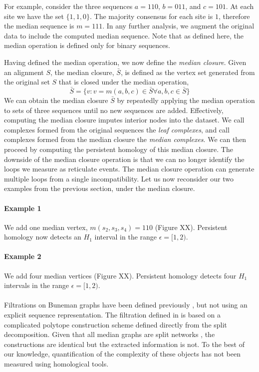 For example, consider the three sequences $a=110$, $b=011$, and $c=101$.
At each site we have the set $\{1,1,0\}$.
The majority consensus for each site is $1$, therefore the median sequence is $m=111$.
In any further analysis, we augment the original data to include the computed median sequence.
Note that as defined here, the median operation is defined only for binary sequences.

Having defined the median operation, we now define the \emph{median closure}.
Given an alignment $S$, the median closure, $\bar{S}$, is defined as the vertex set generated from the original set $S$ that is closed under the median operation,
\begin{equation}
\bar{S} = \{v \colon v=m(a,b,c) \in \bar{S} \forall a,b,c \in \bar{S}\}
\end{equation}
We can obtain the median closure $\bar{S}$ by repeatedly applying the median operation to sets of three sequences until no new sequences are added.
Effectively, computing the median closure imputes interior nodes into the dataset.
We call complexes formed from the original sequences the \emph{leaf complexes}, and call complexes formed from the median closure the \emph{median complexes}.
We can then proceed by computing the persistent homology of this median closure.
The downside of the median closure operation is that we can no longer identify the loops we measure as reticulate events.
The median closure operation can generate multiple loops from a single incompatibility.
Let us now reconsider our two examples from the previous section, under the median closure.

\paragraph{Example 1}
We add one median vertex, $m(s_2,s_3,s_4)=110$ (Figure XX).
Persistent homology now detects an $H_{1}$ interval in the range $\epsilon=[1,2)$.

\paragraph{Example 2}
We add four median vertices (Figure XX).
Persistent homology detects four $H_{1}$ intervals in the range $\epsilon=[1,2)$.


\paragraph{}
Filtrations on Buneman graphs have been defined previously \citep{Dress:1997}, but not using an explicit sequence representation.
The filtration defined in \citet{Dress:1997} is based on a complicated polytope construction scheme defined directly from the split decomposition.
Given that all median graphs are split networks \citep{Huson:2010}, the constructions are identical but the extracted information is not.
To the best of our knowledge, quantification of the complexity of these objects has not been measured using homological tools.

